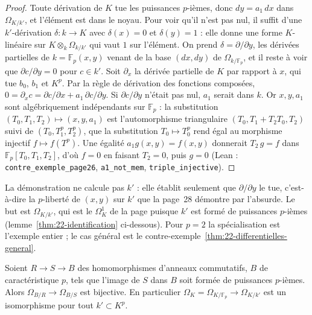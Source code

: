 \begin{proof}
Toute dérivation de $K$ tue les puissances $p$-ièmes, donc $dy = a_1\,dx$ dans $\Omega_{K/k'}$, et l'élément est dans le noyau. Pour voir qu'il n'est pas nul, il suffit d'une $k'$-dérivation $\delta : k \to K$ avec $\delta(x) = 0$ et $\delta(y) = 1$ : elle donne une forme $K$-linéaire sur $K \otimes_k \Omega_{k/k'}$ qui vaut $1$ sur l'élément. On prend $\delta = \partial/\partial y$, les dérivées partielles de $k = \mathbb F_p(x, y)$ venant de la base $(dx, dy)$ de $\Omega_{k/\mathbb F_p}$, et il reste à voir que $\partial c/\partial y = 0$ pour $c \in k'$. Soit $\partial_x$ la dérivée partielle de $K$ par rapport à $x$, qui tue $b_0$, $b_1$ et $K^p$. Par la règle de dérivation des fonctions composées, $0 = \partial_x c = \partial c/\partial x + a_1\, \partial c/\partial y$. Si $\partial c/\partial y$ n'était pas nul, $a_1$ serait dans $k$. Or $x, y, a_1$ sont algébriquement indépendants sur $\mathbb F_p$ : la substitution $(T_0, T_1, T_2) \mapsto (x, y, a_1)$ est l'automorphisme triangulaire $(T_0, T_1 + T_2 T_0, T_2)$ suivi de $(T_0, T_1^p, T_2^p)$, que la substitution $T_0 \mapsto T_0^p$ rend égal au morphisme injectif $f \mapsto f(T^p)$. Une égalité $a_1 g(x, y) = f(x, y)$ donnerait $T_2\, g = f$ dans $\mathbb F_p[T_0, T_1, T_2]$, d'où $f = 0$ en faisant $T_2 = 0$, puis $g = 0$ (Lean : \texttt{contre\_exemple\_page26}, \texttt{a1\_not\_mem}, \texttt{triple\_injective}).
\end{proof}

\begin{remarque}
La démonstration ne calcule pas $k'$ : elle établit seulement que $\partial/\partial y$ le tue, c'est-à-dire la $p$-liberté de $(x, y)$ sur $k'$ que la page~28 démontre par l'absurde. Le but est $\Omega_{K/k'}$, qui est le $\Omega^1_K$ de la page puisque $k'$ est formé de puissances $p$-ièmes (lemme~\ref{thm:22-identification} ci-dessous). Pour $p = 2$ la spécialisation est l'exemple entier ; le cas général est le contre-exemple~\ref{thm:22-differentielles-general}.
\end{remarque}

\begin{encadre}
\begin{lemme}[identification $\Omega_{K/k'} = \Omega_K$]\label{thm:22-identification}
Soient $R \to S \to B$ des homomorphismes d'anneaux commutatifs, $B$ de caractéristique $p$, tels que l'image de $S$ dans $B$ soit formée de puissances $p$-ièmes. Alors $\Omega_{B/R} \to \Omega_{B/S}$ est bijective. En particulier $\Omega_K = \Omega_{K/\mathbb F_p} \to \Omega_{K/k'}$ est un isomorphisme pour tout $k' \subset K^p$.
\end{lemme}
\end{encadre}

